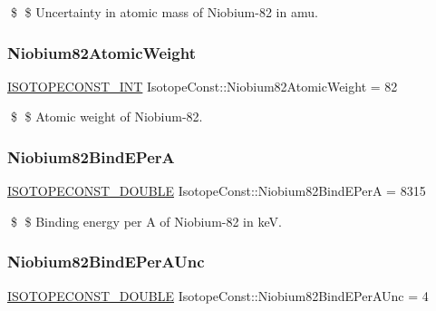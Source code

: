 \$ \$ Uncertainty in atomic mass of Niobium-\/82 in amu. \mbox{\label{group___isotope_const-_niobium-_nb82_ga08c48614d87fc7338eb25e33d03c3dfe}} 
\subsubsection{\texorpdfstring{Niobium82\+Atomic\+Weight}{Niobium82AtomicWeight}}
{\footnotesize\ttfamily \mbox{\hyperlink{group___isotope_const-_macros_ga5f18360b3e99483a35c32d789e62621c}{I\+S\+O\+T\+O\+P\+E\+C\+O\+N\+S\+T\+\_\+\+I\+NT}} Isotope\+Const\+::\+Niobium82\+Atomic\+Weight = 82}

\$ \$ Atomic weight of Niobium-\/82. \mbox{\label{group___isotope_const-_niobium-_nb82_ga4ddb4d9e2d1375661ee8d25af33a4ad3}} 
\subsubsection{\texorpdfstring{Niobium82\+Bind\+E\+PerA}{Niobium82BindEPerA}}
{\footnotesize\ttfamily \mbox{\hyperlink{group___isotope_const-_macros_ga8f45a7272ce02c0b4c65c44636ed719a}{I\+S\+O\+T\+O\+P\+E\+C\+O\+N\+S\+T\+\_\+\+D\+O\+U\+B\+LE}} Isotope\+Const\+::\+Niobium82\+Bind\+E\+PerA = 8315}

\$ \$ Binding energy per A of Niobium-\/82 in keV. \mbox{\label{group___isotope_const-_niobium-_nb82_ga9edcd6db59b355835c76b86ec036e804}} 
\subsubsection{\texorpdfstring{Niobium82\+Bind\+E\+Per\+A\+Unc}{Niobium82BindEPerAUnc}}
{\footnotesize\ttfamily \mbox{\hyperlink{group___isotope_const-_macros_ga8f45a7272ce02c0b4c65c44636ed719a}{I\+S\+O\+T\+O\+P\+E\+C\+O\+N\+S\+T\+\_\+\+D\+O\+U\+B\+LE}} Isotope\+Const\+::\+Niobium82\+Bind\+E\+Per\+A\+Unc = 4}

